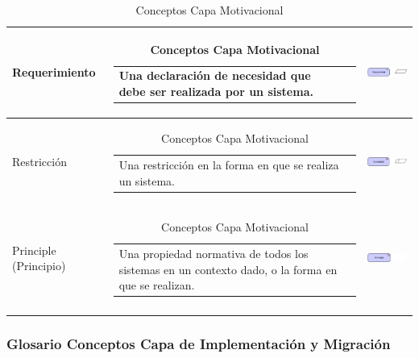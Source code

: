 \begin{longtable}[c]{|p{2.5cm}|l|c|}
	Requerimiento				& \begin{tabular}[c]{p{7cm}@{}l@{}}Una declaración de necesidad que debe ser realizada por un sistema.\end{tabular} & \includegraphics[width=35mm]{arquitectura/adm_lenguaje/imgs/motivational/Requirement}          \\ \hline
	Restricción					& \begin{tabular}[c]{p{7cm}@{}l@{}}Una restricción en la forma en que se realiza un sistema.\end{tabular} & \includegraphics[width=35mm]{arquitectura/adm_lenguaje/imgs/motivational/Constraint}          \\ \hline
	Principle (Principio)	   	& \begin{tabular}[c]{p{7cm}@{}l@{}}Una propiedad normativa de todos los sistemas en un contexto dado, o la forma en que se realizan.\end{tabular} & \includegraphics[width=35mm]{arquitectura/adm_lenguaje/imgs/motivational/Principle}          \\ \hline
	\caption{Conceptos Capa Motivacional \cite{WEB7}}
\end{longtable}



\newpage

\subsubsection{Glosario Conceptos Capa de Implementación y Migración}

